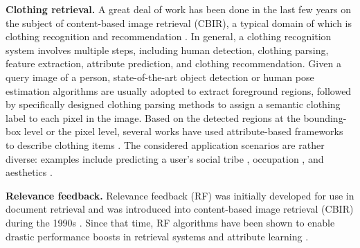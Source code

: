 \documentclass[journal]{IEEEtran}
\begin{document}
\textbf{Clothing retrieval.} A great deal of work has been done in the last few years on the subject of content-based image retrieval (CBIR)\cite{murala2012local,chu2013robust,chen2013scalable}, a typical domain of which is clothing recognition and recommendation \cite{liu2012hi,kalantidis2013getting,jagadeesh2014large}. In general, a clothing recognition system involves multiple steps, including human detection, clothing parsing, feature extraction, attribute prediction, and clothing recommendation. Given a query image of a person, state-of-the-art object detection \cite{girshick2014rich} or human pose estimation algorithms \cite{yang2011articulated} are usually adopted to extract foreground regions, followed by specifically designed clothing parsing methods \cite{yamaguchi2013paper,liu2014fashion,liang2015human,liang2016clothes,zhao2016clothing} to assign a semantic clothing label to each pixel in the image. Based on the detected regions at the bounding-box level or the pixel level, several works have used attribute-based frameworks to describe clothing items \cite{bossard2012apparel,chen2012describing,chen2015deep,abdulnabi2015multi}. The considered application scenarios are rather diverse: examples include predicting a user's social tribe \cite{kwak2013bikers,hong2015understanding}, occupation \cite{song2011predicting,shao2013you}, and aesthetics \cite{liu2012hi,kiapour2014hipster,simo2015neuroaesthetics,su2012preference}.


\textbf{Relevance feedback.}
Relevance feedback (RF)
was initially developed for use in document retrieval \cite{rocchio1966document} and was introduced into content-based image retrieval (CBIR) during the 1990s \cite{kurita1993learning}. Since that time, RF algorithms have been shown to enable drastic performance boosts in retrieval systems \cite{kherfi2006relevance,tao2006direct,auer2010pinview,lu2003joint,zhou2003relevance,grigorova2007content,broilo2010stochastic,bian2010biased,sun2010image,su2011efficient} and attribute learning \cite{kovashka2012whittlesearch, biswas2013simultaneous}.
\end{document}
